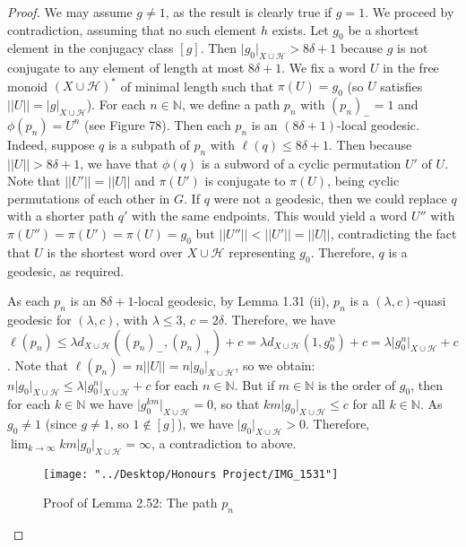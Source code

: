 \documentclass[12pt]{article}
\newcommand{\vs}{\vskip10pt}
\begin{document}
	\begin{proof}
		
		We may assume $g \neq 1$, as the result is clearly true if $g = 1$. We proceed by contradiction, assuming that no such element $h$ exists. Let $g_0$ be a shortest element in the conjugacy class $[g]$. Then $\vert g_0 \vert_{X \cup \mathcal{H}} > 8 \delta + 1$ because $g$ is not conjugate to any element of length at most $8 \delta + 1$. We fix a word $U$ in the free monoid $(X \cup \mathcal{H})^*$ of minimal length such that $\pi(U) = g_0$ (so $U$ satisfies $\vert \vert U \vert \vert = \vert g \vert_{X \cup \mathcal{H}}$). For each $n \in \mathbb{N}$, we define a path $p_n$ with $(p_n)_- = 1$ and $\phi(p_n) = U^n$ (see Figure 78). Then each $p_n$ is an $(8 \delta + 1)$-local geodesic. Indeed, suppose $q$ is a subpath of $p_n$ with $\ell(q) \leq 8 \delta + 1$. Then because $\vert \vert U \vert \vert > 8 \delta + 1$, we have that $\phi(q)$ is a subword of a cyclic permutation $U'$ of $U$. Note that $\vert \vert U' \vert \vert = \vert \vert U \vert \vert $ and $\pi(U')$ is conjugate to $\pi(U)$, being cyclic permutations of each other in $G$. If $q$ were not a geodesic, then we could replace $q$ with a shorter path $q'$ with the same endpoints. This would yield a word $U''$ with $\pi(U'') = \pi(U') = \pi(U) = g_0$ but $\vert \vert U'' \vert \vert < \vert \vert U' \vert \vert = \vert \vert U \vert \vert$, contradicting the fact that $U$ is the shortest word over $X \cup \mathcal{H}$ representing $g_0$. Therefore, $q$ is a geodesic, as required. 
		
		\vs 
		
		As each $p_n$ is an $8 \delta +1$-local geodesic, by Lemma 1.31 (ii), $p_n$ is a $(\lambda, c)$-quasi geodesic for $(\lambda, c)$, with $\lambda \leq 3$, $c = 2 \delta$. Therefore, we have $\ell(p_n) \leq \lambda d_{X \cup \mathcal{H}}((p_n)_-, (p_n)_+) + c = \lambda d_{X \cup \mathcal{H}}(1, g_0^n) + c = \lambda \vert g_0^n \vert_{X \cup \mathcal{H}} + c$. Note that $\ell(p_n) = n \vert \vert U \vert \vert = n \vert g_0 \vert_{X \cup \mathcal{H}}$, so we obtain: $n \vert g_0 \vert_{X \cup \mathcal{H}} \leq \lambda \vert g_0^n \vert_{X \cup \mathcal{H}} + c$ for each $n \in \mathbb{N}$. But if $m \in \mathbb{N}$ is the order of $g_0$, then for each $k \in \mathbb{N}$ we have $\vert g_0^{km} \vert_{X \cup \mathcal{H}} = 0$, so that $km \vert g_0 \vert_{X \cup \mathcal{H}} \leq c$ for all $k \in \mathbb{N}$. As $g_0 \neq 1$ (since $g \neq 1$, so $1 \notin [g]$), we have $\vert g_0 \vert_{X \cup \mathcal{H}} > 0$. Therefore, $\lim_{k \rightarrow \infty} km \vert g_0 \vert_{X \cup \mathcal{H}} = \infty$, a contradiction to above. 
		
\begin{figure} [H]
	\centering
	\texttt{[image: "../Desktop/Honours Project/IMG\_1531"]}
	\caption{Proof of Lemma 2.52: The path $p_n$}
	\label{fig:img1531}
\end{figure}
		
	\end{proof}
	
\end{document}
